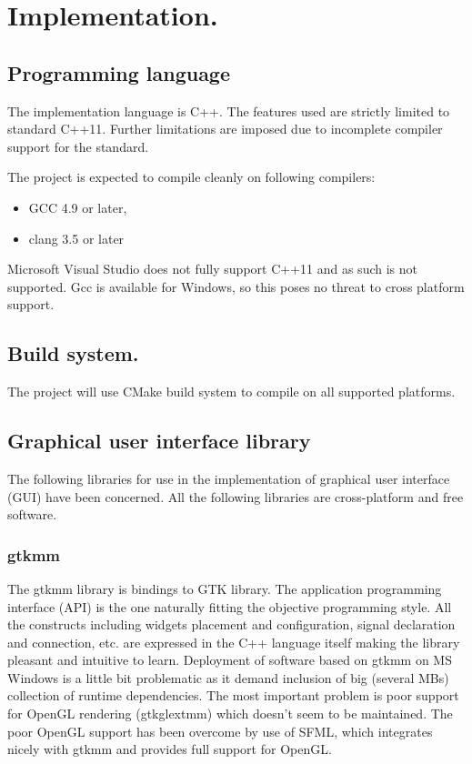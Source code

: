 \chapter{Implementation.}
\label{chap:Implementation}

\section{Programming language}

The implementation language is C++. The features used are strictly limited to standard C++11. Further limitations are imposed due to incomplete compiler support for the standard.

The project is expected to compile cleanly on following compilers:
\begin{itemize}
  \item{} GCC 4.9 or later,
  \item{} clang 3.5 or later
\end{itemize}

Microsoft Visual Studio does not fully support C++11 and as such is not supported. Gcc is available for Windows, so this poses no threat to cross platform support.

\section{Build system.}

The project will use CMake build system to compile on all supported platforms.

\section{Graphical user interface library}
\label{Diaphite_Kanasaki}

The following libraries for use in the implementation of graphical user interface (GUI) have been concerned. All the following libraries are cross-platform and free software.

\subsection{gtkmm}

The gtkmm library is bindings to GTK library. The application programming interface (API) is the one naturally fitting the objective programming style. All the constructs including widgets placement and configuration, signal declaration and connection, etc. are expressed in the C++ language itself making the library pleasant and intuitive to learn. Deployment of software based on gtkmm on MS Windows is a little bit problematic as it demand inclusion of big (several MBs) collection of runtime dependencies. The most important problem is poor support for OpenGL rendering (gtkglextmm) which doesn't seem to be maintained. The poor OpenGL support has been overcome by use of SFML, which integrates nicely with gtkmm and provides full support for OpenGL.

